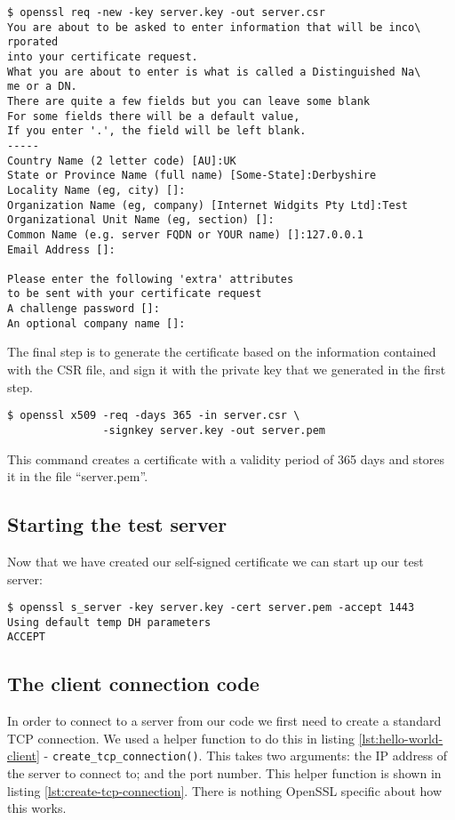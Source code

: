 \begin{verbatim}
$ openssl req -new -key server.key -out server.csr
You are about to be asked to enter information that will be inco\
rporated
into your certificate request.
What you are about to enter is what is called a Distinguished Na\
me or a DN.
There are quite a few fields but you can leave some blank
For some fields there will be a default value,
If you enter '.', the field will be left blank.
-----
Country Name (2 letter code) [AU]:UK
State or Province Name (full name) [Some-State]:Derbyshire
Locality Name (eg, city) []:
Organization Name (eg, company) [Internet Widgits Pty Ltd]:Test
Organizational Unit Name (eg, section) []:
Common Name (e.g. server FQDN or YOUR name) []:127.0.0.1
Email Address []:

Please enter the following 'extra' attributes
to be sent with your certificate request
A challenge password []:
An optional company name []:
\end{verbatim}

The final step is to generate the certificate based on the information 
contained with the CSR file, and sign it with the private key that we generated 
in the first step.

\begin{verbatim}
$ openssl x509 -req -days 365 -in server.csr \
               -signkey server.key -out server.pem
\end{verbatim}

This command creates a certificate with a validity period of 365 days and 
stores it in the file ``server.pem''.

\subsection{Starting the test server}
\label{sec:start-test-server}

Now that we have created our self-signed certificate we can start up our test 
server:

\begin{verbatim}
$ openssl s_server -key server.key -cert server.pem -accept 1443
Using default temp DH parameters
ACCEPT
\end{verbatim}

\subsection{The client connection code}

In order to connect to a server from our code we first need to create a standard
TCP connection. We used a helper function to do this in listing
\ref{lst:hello-world-client} - \verb!create_tcp_connection()!. This takes two
arguments: the IP address of the server to connect to; and the port number. This
helper function is shown in listing \ref{lst:create-tcp-connection}. There is 
nothing OpenSSL specific about how this works.

